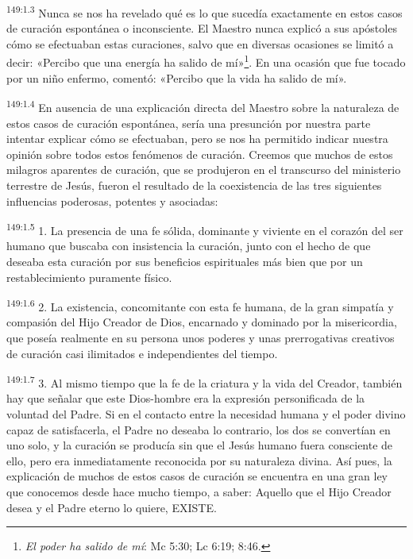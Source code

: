\par
\textsuperscript{149:1.3} Nunca se nos ha revelado qué es lo que sucedía exactamente en estos casos de curación espontánea o inconsciente. El Maestro nunca explicó a sus apóstoles cómo se efectuaban estas curaciones, salvo que en diversas ocasiones se limitó a decir: «Percibo que una energía ha salido de mí»\footnote{\textit{El poder ha salido de mí}: Mc 5:30; Lc 6:19; 8:46.}. En una ocasión que fue tocado por un niño enfermo, comentó: «Percibo que la vida ha salido de mí».

\par
\textsuperscript{149:1.4} En ausencia de una explicación directa del Maestro sobre la naturaleza de estos casos de curación espontánea, sería una presunción por nuestra parte intentar explicar cómo se efectuaban, pero se nos ha permitido indicar nuestra opinión sobre todos estos fenómenos de curación. Creemos que muchos de estos milagros aparentes de curación, que se produjeron en el transcurso del ministerio terrestre de Jesús, fueron el resultado de la coexistencia de las tres siguientes influencias poderosas, potentes y asociadas:

\par
\textsuperscript{149:1.5} 1. La presencia de una fe sólida, dominante y viviente en el corazón del ser humano que buscaba con insistencia la curación, junto con el hecho de que deseaba esta curación por sus beneficios espirituales más bien que por un restablecimiento puramente físico.

\par
\textsuperscript{149:1.6} 2. La existencia, concomitante con esta fe humana, de la gran simpatía y compasión del Hijo Creador de Dios, encarnado y dominado por la misericordia, que poseía realmente en su persona unos poderes y unas prerrogativas creativos de curación casi ilimitados e independientes del tiempo.

\par
\textsuperscript{149:1.7} 3. Al mismo tiempo que la fe de la criatura y la vida del Creador, también hay que señalar que este Dios-hombre era la expresión personificada de la voluntad del Padre. Si en el contacto entre la necesidad humana y el poder divino capaz de satisfacerla, el Padre no deseaba lo contrario, los dos se convertían en uno solo, y la curación se producía sin que el Jesús humano fuera consciente de ello, pero era inmediatamente reconocida por su naturaleza divina. Así pues, la explicación de muchos de estos casos de curación se encuentra en una gran ley que conocemos desde hace mucho tiempo, a saber: Aquello que el Hijo Creador desea y el Padre eterno lo quiere, EXISTE.

